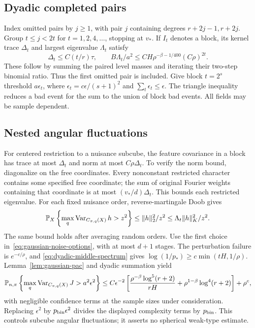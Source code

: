 \subsection{Dyadic completed pairs}
Index omitted pairs by $j\ge1$, with pair $j$ containing degrees
$r+2j-1,r+2j$. Group $t\le j<2t$ for $t=1,2,4,\ldots$, stopping at
$v_*$. If $I_t$ denotes a block, its kernel trace $\Delta_t$ and largest
eigenvalue $\Lambda_t$ satisfy
\begin{equation}\label{eq:dyadic-middle-spectrum}
 \Delta_t\le C(t/r)\tau,
 \qquad B\Lambda_t/a^2
       \le CH\rho^{-\beta-1/400}(C\rho)^{2t}.
\end{equation}
These follow by summing the paired level masses and iterating their
two-step binomial ratio. Thus the first omitted pair is included.
Give block $t=2^s$ threshold $a\epsilon_t$, where
$\epsilon_t=c\epsilon/(s+1)^2$ and $\sum_t\epsilon_t\le\epsilon$.
The triangle inequality reduces a bad event for the sum to the union
of block bad events. All fields may be sample dependent.

\subsection{Nested angular fluctuations}
For centered restriction to a nuisance subcube, the feature covariance
in a block has trace at most $\Delta_t$ and norm at most $C\rho\Delta_t$.
To verify the norm bound, diagonalize on the free coordinates. Every
nonconstant restricted character contains some specified free coordinate;
the sum of original Fourier weights containing that coordinate is at
most $(v_*/d)\Delta_t$. This bounds each restricted eigenvalue.
For each fixed nuisance order, reverse-martingale Doob gives
\[
 \mathbb P_X\left\{\max_q\operatorname{Var}_{C_{\pi,q}(X)}h>z^2\right\}
 \le\|h\|_2^2/z^2\le\Lambda_t\|h\|_K^2/z^2.
\]
The same bound holds after averaging random orders.
Use the first choice in~\eqref{eq:gaussian-noise-options}, with at most
$d+1$ stages. The perturbation failure is $e^{-c/\rho}$, and
\eqref{eq:dyadic-middle-spectrum} gives
$\log(1/p_*)\ge c\min(tH,1/\rho)$.
Lemma~\ref{lem:gaussian-pac} and dyadic summation yield
\begin{equation}\label{eq:nested-angular-pac}
 \mathbb P_{n,\pi}\left\{\max_q\operatorname{Var}_{C_{\pi,q}(X)}J>
                                      a^2\epsilon^2\right\}
 \le C\epsilon^{-2}\left[
 \frac{\rho^{-\beta}\log^5(r+2)}{rH}
           +\rho^{1-\beta}\log^4(r+2)\right]+\rho^c,
\end{equation}
with negligible confidence terms at the sample sizes under consideration.
Replacing $\epsilon^2$ by $p_{\rm bin}\epsilon^2$ divides the displayed
complexity terms by $p_{\rm bin}$. This controls subcube angular
fluctuations; it asserts no spherical weak-type estimate.

